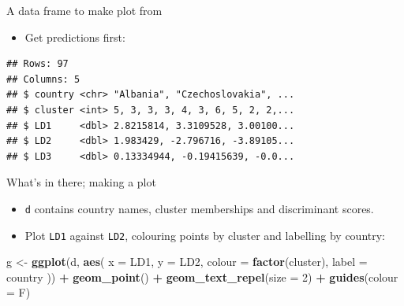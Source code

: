 \documentclass[
  ignorenonframetext,
]{beamer}
\newenvironment{Shaded}{\begin{snugshade}}{\end{snugshade}}
\newcommand{\DataTypeTok}[1]{\textcolor[rgb]{0.13,0.29,0.53}{#1}}
\newcommand{\DecValTok}[1]{\textcolor[rgb]{0.00,0.00,0.81}{#1}}
\newcommand{\KeywordTok}[1]{\textcolor[rgb]{0.13,0.29,0.53}{\textbf{#1}}}
\newcommand{\NormalTok}[1]{#1}
\newcommand{\OperatorTok}[1]{\textcolor[rgb]{0.81,0.36,0.00}{\textbf{#1}}}
\newcommand{\StringTok}[1]{\textcolor[rgb]{0.31,0.60,0.02}{#1}}
\providecommand{\tightlist}{%
  \setlength{\itemsep}{0pt}\setlength{\parskip}{0pt}}
\begin{document}
\begin{frame}[fragile]{A data frame to make plot from}
\protect\hypertarget{a-data-frame-to-make-plot-from}{}

\begin{itemize}
\tightlist
\item
  Get predictions first:
\end{itemize}

\small

\begin{Shaded}
\end{Shaded}

\begin{verbatim}
## Rows: 97
## Columns: 5
## $ country <chr> "Albania", "Czechoslovakia", ...
## $ cluster <int> 5, 3, 3, 3, 4, 3, 6, 5, 2, 2,...
## $ LD1     <dbl> 2.8215814, 3.3109528, 3.00100...
## $ LD2     <dbl> 1.983429, -2.796716, -3.89105...
## $ LD3     <dbl> 0.13334944, -0.19415639, -0.0...
\end{verbatim}

\normalsize

\end{frame}

\begin{frame}[fragile]{What's in there; making a plot}
\protect\hypertarget{whats-in-there-making-a-plot}{}

\begin{itemize}
\tightlist
\item
  \texttt{d} contains country names, cluster memberships and
  discriminant scores.
\item
  Plot \texttt{LD1} against \texttt{LD2}, colouring points by cluster
  and labelling by country:
\end{itemize}

\begin{Shaded}
\begin{Highlighting}[]
\NormalTok{g <-}\StringTok{ }\KeywordTok{ggplot}\NormalTok{(d, }\KeywordTok{aes}\NormalTok{(}
  \DataTypeTok{x =}\NormalTok{ LD1, }\DataTypeTok{y =}\NormalTok{ LD2, }\DataTypeTok{colour =} \KeywordTok{factor}\NormalTok{(cluster),}
  \DataTypeTok{label =}\NormalTok{ country}
\NormalTok{)) }\OperatorTok{+}\StringTok{ }\KeywordTok{geom_point}\NormalTok{() }\OperatorTok{+}
\StringTok{  }\KeywordTok{geom_text_repel}\NormalTok{(}\DataTypeTok{size =} \DecValTok{2}\NormalTok{) }\OperatorTok{+}\StringTok{ }\KeywordTok{guides}\NormalTok{(}\DataTypeTok{colour =}\NormalTok{ F)}
\end{Highlighting}
\end{Shaded}

\end{frame}
\end{document}
